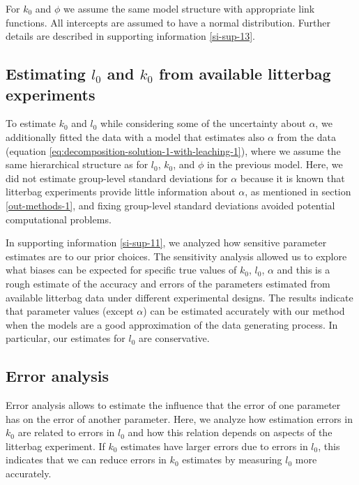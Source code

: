 \documentclass[bg, manuscript]{copernicus}
\begin{document}
For \(k_0\) and \(\phi\) we assume the same model structure with appropriate link functions. All intercepts are assumed to have a normal distribution. Further details are described in supporting information \ref{si-sup-13}.

\hypertarget{methods-estimate-real-1}{%
\subsection{\texorpdfstring{Estimating \(l_0\) and \(k_0\) from available litterbag experiments}{Estimating l\_0 and k\_0 from available litterbag experiments}}\label{methods-estimate-real-1}}

To estimate \(k_0\) and \(l_0\) while considering some of the uncertainty about \(\alpha\), we additionally fitted the data with a model that estimates also \(\alpha\) from the data (equation \eqref{eq:decomposition-solution-1-with-leaching-1}), where we assume the same hierarchical structure as for \(l_0\), \(k_0\), and \(\phi\) in the previous model. Here, we did not estimate group-level standard deviations for \(\alpha\) because it is known that litterbag experiments provide little information about \(\alpha\), as mentioned in section \ref{out-methods-1}, and fixing group-level standard deviations avoided potential computational problems.

In supporting information \ref{si-sup-11}, we analyzed how sensitive parameter estimates are to our prior choices. The sensitivity analysis allowed us to explore what biases can be expected for specific true values of \(k_0\), \(l_0\), \(\alpha\) and this is a rough estimate of the accuracy and errors of the parameters estimated from available litterbag data under different experimental designs. The results indicate that parameter values (except \(\alpha\)) can be estimated accurately with our method when the models are a good approximation of the data generating process. In particular, our estimates for \(l_0\) are conservative.

\subsection{Error analysis}

Error analysis allows to estimate the influence that the error of one parameter has on the error of another parameter. Here, we analyze how estimation errors in \(k_0\) are related to errors in \(l_0\) and how this relation depends on aspects of the litterbag experiment. If \(k_0\) estimates have larger errors due to errors in \(l_0\), this indicates that we can reduce errors in \(k_0\) estimates by measuring \(l_0\) more accurately.
\end{document}
